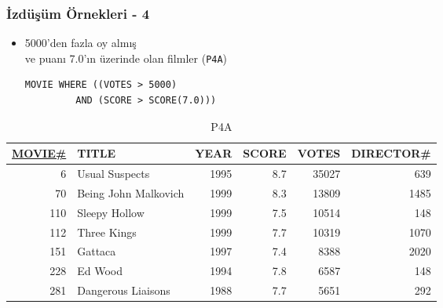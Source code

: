 \documentclass[dvipsnames]{beamer}
\theoremstyle{plain}
\begin{document}
\begin{frame}[fragile]
  \frametitle{İzdüşüm Örnekleri - 4}

    \begin{itemize}
      \item 5000'den fazla oy almış\\
      ve puanı 7.0'ın üzerinde olan filmler (\texttt{P4A})

    \begin{lstlisting}
MOVIE WHERE ((VOTES > 5000)
         AND (SCORE > SCORE(7.0)))
    \end{lstlisting}
    \end{itemize}

    \vspace{-10pt}
    \begin{tiny}
    \begin{table}
      \caption{P4A}
      \begin{tabular}{|r|l|r|r|r|r|}\hline
\underline{MOVIE\#} & TITLE & YEAR & SCORE & VOTES & DIRECTOR\#\\[2pt]\hline\hline
   6 & Usual Suspects       & 1995 &   8.7 & 35027 &        639\\\hline
  70 & Being John Malkovich & 1999 &   8.3 & 13809 &       1485\\\hline
 110 & Sleepy Hollow        & 1999 &   7.5 & 10514 &        148\\\hline
 112 & Three Kings          & 1999 &   7.7 & 10319 &       1070\\\hline
 151 & Gattaca              & 1997 &   7.4 &  8388 &       2020\\\hline
 228 & Ed Wood              & 1994 &   7.8 &  6587 &        148\\\hline
 281 & Dangerous Liaisons   & 1988 &   7.7 &  5651 &        292\\\hline
      \end{tabular}
    \end{table}
    \end{tiny}
\end{frame}
\end{document}
